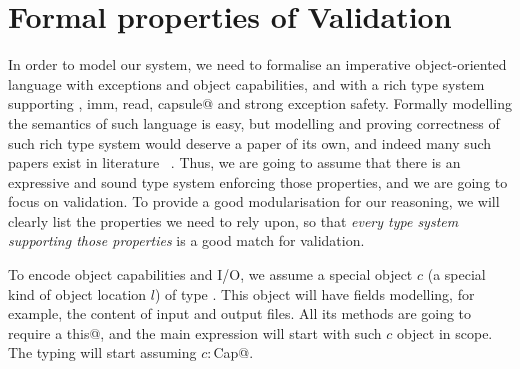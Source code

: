 \saveSpace
\section{Formal properties of Validation}
\label{s:meaning}
\saveSpace
In order to model our system, we need to formalise an imperative object-oriented language
with exceptions and object capabilities,  and with a rich type system
supporting \Q@mut, imm, read, capsule@ and strong exception safety.
Formally modelling the semantics of such language is easy, but 
modelling and proving correctness of such rich type system would deserve a paper
of its own, and indeed many such papers exist in literature%
~\cite{ServettoEtAl13a,ServettoZucca15,GordonEtAl12,clebsch2015deny,JOT:issue_2011_01/article1}.
Thus, we are going to assume that there is an expressive and sound type system enforcing
those properties, and we are going to focus on validation.
To provide a good modularisation for our reasoning, 
we will clearly list the properties we need to rely upon, so that \emph{every type
system supporting those properties} is a good match for validation.

To encode object capabilities and I/O, we assume a special object
$c$ (a special kind of object location $l$) of type \Q@Cap@.
This object will have fields modelling, for example, the content of input and output files.
All its methods are going to require a \Q@mut this@, and the main expression will start with
such  $c$ object in scope.
The typing will start assuming $c:$\Q@mut Cap@.

